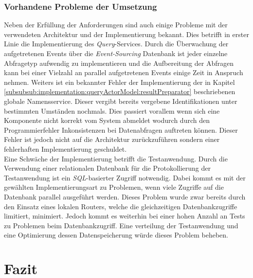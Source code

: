 \subsection{Vorhandene Probleme der Umsetzung}
Neben der Erfüllung der Anforderungen sind auch einige Probleme mit der verwendeten Architektur und der Implementierung bekannt. Dies betrifft in erster Linie die Implementierung des \textit{Query}-Services. Durch die Überwachung der aufgetretenen Events über die \textit{Event-Sourcing} Datenbank ist jeder einzelne Abfragetyp aufwendig zu implementieren und die Aufbereitung der Abfragen kann bei einer Vielzahl an parallel aufgetretenen Events einige Zeit in Anspruch nehmen. Weiters ist ein bekannter Fehler der Implementierung der in Kapitel \ref{subsubsub:implementation:queryActorModel:resultPreparator} beschriebenen globale Namensservice. Dieser vergibt bereits vergebene Identifikationen unter bestimmten Umständen nochmals. Dies passiert vorallem wenn sich eine Komponente nicht korrekt vom System abmeldet wodurch durch den Programmierfehler Inkonsistenzen bei Datenabfragen auftreten können. Dieser Fehler ist jedoch nicht auf die Architektur zurückzuführen sondern einer fehlerhaften Implementierung geschuldet. \\
Eine Schwäche der Implementierung betrifft die Testanwendung. Durch die Verwendung einer relationalen Datenbank für die Protokollierung der Testanwendung ist ein \textit{SQL}-basierter Zugriff notwendig. Dabei kommt es mit der gewählten Implementierungsart zu Problemen, wenn viele Zugriffe auf die Datenbank parallel ausgeführt werden. Dieses Problem wurde zwar bereits durch den Einsatz eines lokalen Routers, welche die gleichzeitigen Datenbankzugriffe limitiert, minimiert. Jedoch kommt es weiterhin bei einer hohen Anzahl an Tests zu Problemen beim Datenbankzugriff. Eine verteilung der Testanwendung und eine Optimierung dessen Datenspeicherung würde dieses Problem beheben.

\chapter{Fazit}
